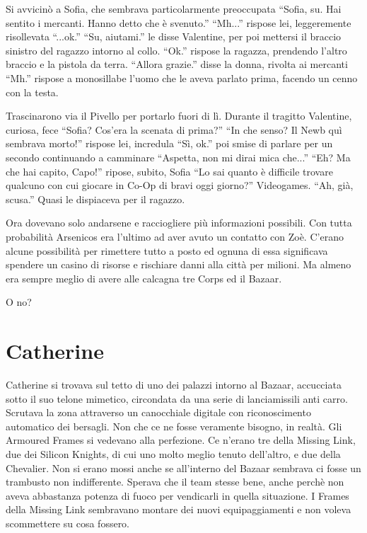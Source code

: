     Si avvicinò a Sofia, che sembrava particolarmente preoccupata ``Sofia, su. Hai sentito i mercanti. Hanno detto che è
    svenuto.'' ``Mh...'' rispose lei, leggeremente risollevata ``...ok.'' ``Su, aiutami.'' le disse Valentine, per poi
    mettersi il braccio sinistro del ragazzo intorno al collo. ``Ok.'' rispose la ragazza, prendendo l'altro braccio e
    la pistola da terra. ``Allora grazie.'' disse la donna, rivolta ai mercanti ``Mh.'' rispose a monosillabe l'uomo che
    le aveva parlato prima, facendo un cenno con la testa.

    Trascinarono via il Pivello per portarlo fuori di lì. Durante il tragitto Valentine, curiosa, fece ``Sofia? Cos'era
    la scenata di prima?'' ``In che senso? Il Newb quì sembrava morto!'' rispose lei, incredula ``Sì, ok.'' poi smise di
    parlare per un secondo continuando a camminare ``Aspetta, non mi dirai mica che...'' ``Eh? Ma che hai capito,
    Capo!'' ripose, subito, Sofia ``Lo sai quanto è difficile trovare qualcuno con cui giocare in Co-Op di bravi oggi
    giorno?'' Videogames. ``Ah, già, scusa.'' Quasi le dispiaceva per il ragazzo.

    Ora dovevano solo andarsene e racciogliere più informazioni possibili. Con tutta probabilità Arsenicos era l'ultimo
    ad aver avuto un contatto con Zoè. C'erano alcune possibilità per rimettere tutto a posto ed ognuna di essa
    significava spendere un casino di risorse e rischiare danni alla città per milioni. Ma almeno era sempre meglio di
    avere alle calcagna tre Corps ed il Bazaar.

    O no?

  \section*{Catherine}

    Catherine si trovava sul tetto di uno dei palazzi intorno al Bazaar, accucciata sotto il suo telone mimetico,
    circondata da una serie di lanciamissili anti carro. Scrutava la zona attraverso un canocchiale digitale con
    riconoscimento automatico dei bersagli. Non che ce ne fosse veramente bisogno, in realtà. Gli Armoured Frames si
    vedevano alla perfezione. Ce n'erano tre della Missing Link, due dei Silicon Knights, di cui uno molto meglio tenuto
    dell'altro, e due della Chevalier. Non si erano mossi anche se all'interno del Bazaar sembrava ci fosse un trambusto
    non indifferente. Sperava che il team stesse bene, anche perchè non aveva abbastanza potenza di fuoco per vendicarli
    in quella situazione. I Frames della Missing Link sembravano montare dei nuovi equipaggiamenti e non voleva
    scommettere su cosa fossero.

